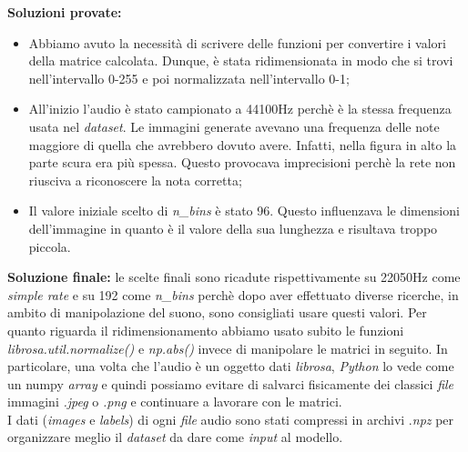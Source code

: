\newline
\textbf{Soluzioni provate:}
\begin{itemize}
	\item Abbiamo avuto la necessità di scrivere delle funzioni per convertire i valori della matrice calcolata. Dunque, è stata ridimensionata in modo che si trovi nell'intervallo 0-255 e poi normalizzata nell'intervallo 0-1;
	\item All'inizio l'audio è stato campionato a 44100Hz perchè è la stessa frequenza usata nel \textit{dataset}. Le immagini generate avevano una frequenza delle note maggiore di quella che avrebbero dovuto avere. Infatti, nella figura in alto la parte scura era più spessa. Questo provocava imprecisioni perchè la rete non riusciva a riconoscere la nota corretta;
	\item Il valore iniziale scelto di \textit{n\_bins} è stato 96. Questo influenzava le dimensioni dell'immagine in quanto è il valore della sua lunghezza e risultava troppo piccola.
\end{itemize}
\textbf{Soluzione finale:} le scelte finali sono ricadute rispettivamente su 22050Hz come \textit{simple rate} e su 192 come \textit{n\_bins} perchè dopo aver effettuato diverse ricerche, in ambito di manipolazione del suono, sono consigliati usare questi valori. Per quanto riguarda il ridimensionamento abbiamo usato subito le funzioni \textit{librosa.util.normalize()} e \textit{np.abs()} invece di manipolare le matrici in seguito.
\vspace*{2ex}
\vspace*{2ex}
\noindent In particolare, una volta che l'audio è un oggetto dati \textit{librosa}, \textit{Python} lo vede come un numpy \textit{array} e quindi possiamo evitare di salvarci fisicamente dei classici \textit{file} immagini \textit{.jpeg} o \textit{.png} e continuare a lavorare con le matrici.\\
\newline
I dati (\textit{images} e \textit{labels}) di ogni \textit{file} audio sono stati compressi in archivi .\textit{npz} per organizzare meglio il \textit{dataset} da dare come \textit{input} al modello.
\vspace*{2ex}
\vspace*{2ex}
